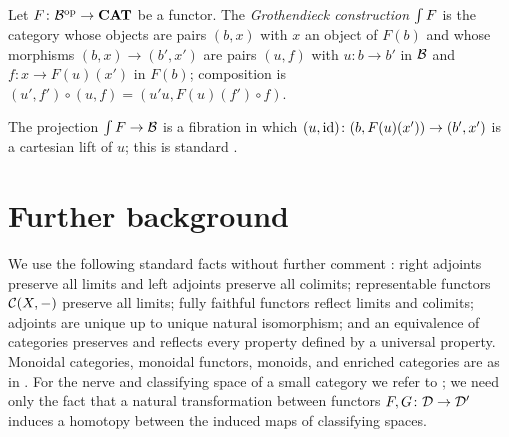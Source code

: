 \begin{definition}\label{def:groth-construction}
Let $F\colon\mathcal{B}^{\mathrm{op}}\to\mathbf{CAT}$ be a functor. The \emph{Grothendieck
construction} $\textstyle\int F$ is the category whose objects are pairs $(b,x)$ with
$x$ an object of $F(b)$ and whose morphisms $(b,x)\to(b',x')$ are pairs
$(u,f)$ with $u\colon b\to b'$ in $\mathcal{B}$ and $f\colon x\to F(u)(x')$ in $F(b)$;
composition is $(u',f')\circ(u,f)=(u'u,F(u)(f')\circ f)$.
\end{definition}

The projection $\textstyle\int F\to\mathcal{B}$ is a fibration in which $(u,\mathrm{id})\colon(b,F(u)(x'))\to(b',x')$
is a cartesian lift of $u$; this is standard \cite{Jacobs1999,Borceux1994}.

\section{Further background}\label{sec:further-background}

We use the following standard facts without further comment
\cite{MacLane1998,Riehl2016}: right adjoints preserve all limits and left
adjoints preserve all colimits; representable functors $\mathcal{C}(X,-)$ preserve
all limits; fully faithful functors reflect limits and colimits; adjoints are
unique up to unique natural isomorphism; and an equivalence of categories
preserves and reflects every property defined by a universal property.
Monoidal categories, monoidal functors, monoids, and enriched categories are
as in \cite{MacLane1998,Kelly1982}. For the nerve and classifying space of a
small category we refer to \cite{Segal1968,Quillen1973}; we need only the fact
that a natural transformation between functors $F,G\colon\mathcal{D}\to\mathcal{D}'$
induces a homotopy between the induced maps of classifying spaces.
